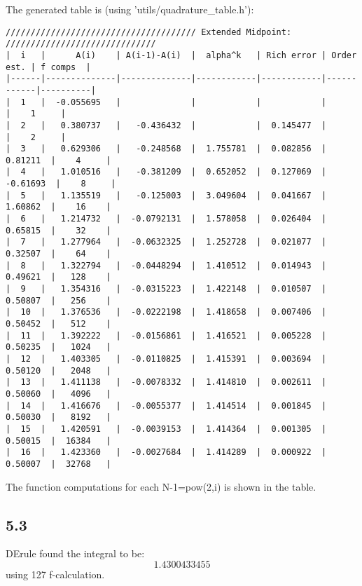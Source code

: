 \documentclass{article}
\begin{document}
The generated table is (using 'utils/quadrature\_table.h'):
\begin{verbatim}
////////////////////////////////////// Extended Midpoint: //////////////////////////////
|  i   |      A(i)    | A(i-1)-A(i)  |  alpha^k   | Rich error | Order est. | f comps  |
|------|--------------|--------------|------------|------------|------------|----------|
|  1   |  -0.055695   |              |            |            |            |    1     |
|  2   |   0.380737   |   -0.436432  |            |  0.145477  |            |    2     |
|  3   |   0.629306   |   -0.248568  |  1.755781  |  0.082856  |   0.81211  |    4     |
|  4   |   1.010516   |   -0.381209  |  0.652052  |  0.127069  |  -0.61693  |    8     |
|  5   |   1.135519   |   -0.125003  |  3.049604  |  0.041667  |   1.60862  |    16    |
|  6   |   1.214732   |  -0.0792131  |  1.578058  |  0.026404  |   0.65815  |    32    |
|  7   |   1.277964   |  -0.0632325  |  1.252728  |  0.021077  |   0.32507  |    64    |
|  8   |   1.322794   |  -0.0448294  |  1.410512  |  0.014943  |   0.49621  |   128    |
|  9   |   1.354316   |  -0.0315223  |  1.422148  |  0.010507  |   0.50807  |   256    |
|  10  |   1.376536   |  -0.0222198  |  1.418658  |  0.007406  |   0.50452  |   512    |
|  11  |   1.392222   |  -0.0156861  |  1.416521  |  0.005228  |   0.50235  |   1024   |
|  12  |   1.403305   |  -0.0110825  |  1.415391  |  0.003694  |   0.50120  |   2048   |
|  13  |   1.411138   |  -0.0078332  |  1.414810  |  0.002611  |   0.50060  |   4096   |
|  14  |   1.416676   |  -0.0055377  |  1.414514  |  0.001845  |   0.50030  |   8192   |
|  15  |   1.420591   |  -0.0039153  |  1.414364  |  0.001305  |   0.50015  |  16384   |
|  16  |   1.423360   |  -0.0027684  |  1.414289  |  0.000922  |   0.50007  |  32768   |
\end{verbatim}

The function computations for each N-1=pow(2,i) is shown in the table.

\subsection*{5.3}
DErule found the integral to be:
$$
1.4300433455
$$
using 127 f-calculation.
\end{document}
